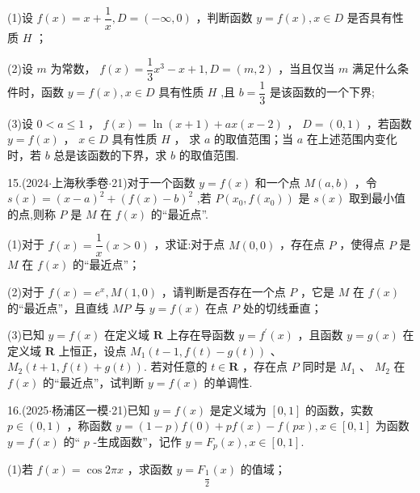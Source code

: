 (1)设 $f\left( x\right)  = x + \dfrac{1}{x},D = \left( {-\infty ,0}\right)$ ，判断函数 $y = f\left( x\right) ,x \in  D$ 是否具有性质 $H$ ；

(2)设 $m$ 为常数， $f\left( x\right)  = \dfrac{1}{3}{x}^{3} - x + 1,D = \left( {m,2}\right)$ ，当且仅当 $m$ 满足什么条件时，函数 $y =  f\left( x\right) ,x \in  D$ 具有性质 $H$ ,且 $b = \dfrac{1}{3}$ 是该函数的一个下界;

(3)设 $0 < a \leq  1$ ， $f\left( x\right)  = \ln \left( {x + 1}\right)  + {ax}\left( {x - 2}\right)$ ， $D = \left( {0,1}\right)$ ，若函数 $y = f\left( x\right)$ ， $x \in  D$ 具有性质 $H$ ， 求 $a$ 的取值范围；当 $a$ 在上述范围内变化时，若 $b$ 总是该函数的下界，求 $b$ 的取值范围.

15.(2024$\cdot$上海秋季卷$\cdot$21)对于一个函数 $y = f\left( x\right)$ 和一个点 $M\left( {a,b}\right)$ ，令 $s\left( x\right)  = {\left( x - a\right) }^{2} +  {\left( f\left( x\right)  - b\right) }^{2}$ ,若 $P\left( {{x}_{0},f\left( {x}_{0}\right) }\right)$ 是 $s\left( x\right)$ 取到最小值的点,则称 $P$ 是 $M$ 在 $f\left( x\right)$ 的“最近点”.

(1)对于 $f\left( x\right)  = \dfrac{1}{x}\left( {x > 0}\right)$ ，求证:对于点 $M\left( {0,0}\right)$ ，存在点 $P$ ，使得点 $P$ 是 $M$ 在 $f\left( x\right)$ 的“最近点”；

(2)对于 $f\left( x\right)  = {{e}}^{x},M\left( {1,0}\right)$ ，请判断是否存在一个点 $P$ ，它是 $M$ 在 $f\left( x\right)$ 的“最近点”，且直线 ${MP}$ 与 $y = f\left( x\right)$ 在点 $P$ 处的切线垂直；

(3)已知 $y = f\left( x\right)$ 在定义域 $\mathbf{R}$ 上存在导函数 $y = {f}^{\prime }\left( x\right)$ ，且函数 $y = g\left( x\right)$ 在定义域 $\mathbf{R}$ 上恒正，设点 ${M}_{1}\left( {t - 1,f\left( t\right)  - g\left( t\right) }\right)$ 、 ${M}_{2}\left( {t + 1,f\left( t\right)  + g\left( t\right) }\right)$. 若对任意的 $t \in  \mathbf{R}$ ，存在点 $P$ 同时是 ${M}_{1}$ 、 ${M}_{2}$ 在 $f\left( x\right)$ 的“最近点”，试判断 $y = f\left( x\right)$ 的单调性.

16.(2025$\cdot$杨浦区一模$\cdot$21)已知 $y = f\left( x\right)$ 是定义域为 $\left\lbrack  {0,1}\right\rbrack$ 的函数，实数 $p \in  \left( {0,1}\right)$ ，称函数 $y =  \left( {1 - p}\right) f\left( 0\right)  + {pf}\left( x\right)  - f\left( {px}\right) ,x \in  \left\lbrack  {0,1}\right\rbrack$ 为函数 $y = f\left( x\right)$ 的“ $p$ -生成函数”，记作 $y = {F}_{p}\left( x\right) ,x \in  \left\lbrack  {0,1}\right\rbrack$.

(1)若 $f\left( x\right)  = \cos {2\pi x}$ ，求函数 $y = {F}_{\dfrac{1}{2}}\left( x\right)$ 的值域；

